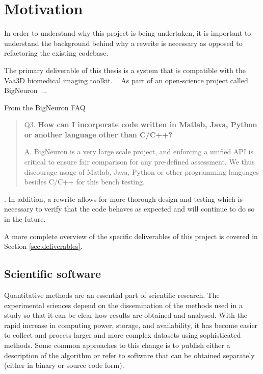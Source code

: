 \section{Motivation}


In order to understand why this project is being undertaken, it is
important to understand the background behind why a rewrite is
necessary as opposed to refactoring the existing codebase.

The primary deliverable of this thesis is a system that is
compatible with the Vaa3D biomedical imaging toolkit.
~\citep{Vaa3D:site:2015,Vaa3D:Peng:2010,Vaa3D:Peng:2014}
As part of an open-science project called
BigNeuron~\citep{BigNeuron:Peng:2015,DIADEM2BigNeuron:Peng:2015}...

From the BigNeuron FAQ~\citep{BigNeuron:FAQ:2015}
\begin{quote}
	\begin{fancyquote}
		Q3. {\bfseries How can I incorporate code written in Matlab, Java, Python or another language other than C/C++?}

		A. BigNeuron is a very large scale project, and enforcing a
		unified API is critical to ensure fair comparison for any pre-defined
		assessment. We thus discourage usage of Matlab, Java, Python or other
		programming languages besides C/C++ for this bench
		testing.
	\end{fancyquote}
\end{quote}


. In addition, a rewrite allows for more thorough
design and testing which is necessary to verify that the code
behaves as expected and will continue to do so in the future.

A more complete overview of the specific deliverables of this project is
covered in Section \ref{sec:deliverables}.

\subsection{Scientific software}
{ %
	Quantitative methods are an essential part of scientific research. The
	experimental sciences depend on the dissemination of the methods used in a
	study so that it can be clear how results are obtained and analysed. With the
	rapid increase in computing power, storage, and availability, it has become
	easier to collect and process larger and more complex datasets using
	sophisticated methods. Some common approaches to this change is to publish either a
	description of the algorithm or refer to software that can be obtained separately
	(either in binary or source code form).
}

